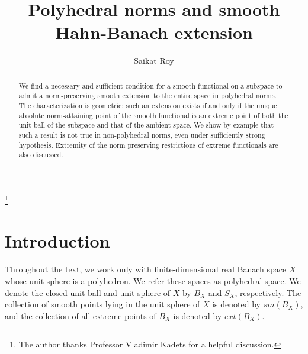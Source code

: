 \documentclass{amsart}
\theoremstyle{definition}
\theoremstyle{remark}
\numberwithin{equation}{section}
\begin{document}
\title[Polyhedral norms and Hahn-Banach extension]{Polyhedral norms and smooth Hahn-Banach extension}

\author{Saikat Roy}

\address[Roy]{Department of Mathematics, School of Advanced Sciences, VIT-AP University, Beside AP Secretariat, Amaravati, 522241, Andhra Pradesh, India.}

\thanks{The author thanks Professor Vladimir Kadets for a helpful discussion.}





\begin{abstract}
We find a necessary and sufficient condition for a smooth functional on a subspace to admit a norm-preserving smooth extension to the entire space in polyhedral norms. The characterization is geometric: such an extension exists if and only if the unique absolute norm-attaining point of the smooth functional is an extreme point of both the unit ball of the subspace and that of the ambient space. We show by example that such a result is not true in non-polyhedral norms, even under sufficiently strong hypothesis. Extremity of the norm preserving restrictions of extreme functionals are also discussed.
\end{abstract}

\maketitle

\section{Introduction}
\noindent Throughout the text, we work only with finite-dimensional real Banach space $X$ whose unit sphere is a polyhedron. We refer these spaces as polyhedral space. We denote the closed unit ball and unit sphere of $X$ by $B_X$ and $S_X$, respectively. The collection of smooth points lying in the unit sphere of $X$ is denoted by $sm(B_X)$, and the collection of all extreme points of $B_X$ is denoted by $ext(B_X)$.
\end{document}
